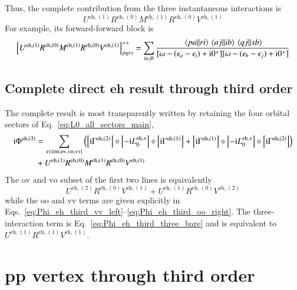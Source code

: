 \documentclass[aip,jcp,reprint,noshowkeys,superscriptaddress]{revtex4-1}
\newcommand{\eps}{\epsilon}
\newcommand{\ii}{\mathrm{i}}
\newcommand{\eh}{\text{eh}}
\begin{document}
Thus, the complete contribution from the three instantaneous interactions is
\begin{equation}
    U^{\eh,(1)}R^{\eh,(0)}M^{\eh,(1)}R^{\eh,(0)}V^{\eh,(1)}
    \label{eq:Phi_eh_third_three_bare}
\end{equation}
For example, its forward-forward block is
\begin{equation}
    \left[
    U^{\eh,(1)}R^{\eh,(0)}M^{\eh,(1)}R^{\eh,(0)}V^{\eh,(1)}
    \right]^{++}_{pqrs}
    =
    \sum_{iajb}
    \frac{
    \mel{pa}{}{ri}\mel{aj}{}{ib}\mel{qj}{}{sb}
    }
    {[\omega-(\eps_a-\eps_i)+\ii0^+]
     [\omega-(\eps_b-\eps_j)+\ii0^+]}
    \label{eq:Phi_eh_third_three_bare_pp}
\end{equation}

\subsection{Complete direct eh result through third order}

The complete result is most transparently written by retaining the four
orbital sectors of Eq.~\eqref{eq:L0_all_sectors_main},
\begin{equation}
    \begin{split}
    \ii\Phi^{\eh,(3)}
    &=
    \sum_{x\in\{\text{oo},\text{ov},\text{vo},\text{vv}\}}
    \qty(
    \left[\ii\Gamma^{\eh,(2)}\right]
    \circ\left[-\ii L_0^{\eh,x}\right]
    \circ\left[\ii\Gamma^{\eh,(1)}\right]
    +
    \left[\ii\Gamma^{\eh,(1)}\right]
    \circ\left[-\ii L_0^{\eh,x}\right]
    \circ\left[\ii\Gamma^{\eh,(2)}\right]
    )
    \\
    &+
    U^{\eh,(1)}R^{\eh,(0)}M^{\eh,(1)}R^{\eh,(0)}V^{\eh,(1)}
    \end{split}
    \label{eq:Phi_eh_third_final}
\end{equation}
The $\text{ov}$ and $\text{vo}$ subset of the first two lines is equivalently
\begin{equation}
    U^{\eh,(2)}R^{\eh,(0)}V^{\eh,(1)}
    +
    U^{\eh,(1)}R^{\eh,(0)}V^{\eh,(2)}
    \label{eq:Phi_eh_third_ovvo_resolvent}
\end{equation}
while the $\text{oo}$ and $\text{vv}$ terms are given explicitly in
Eqs.~\eqref{eq:Phi_eh_third_vv_left}--\eqref{eq:Phi_eh_third_oo_right}.
The three-interaction term is Eq.~\eqref{eq:Phi_eh_third_three_bare} and is
equivalent to $U^{\eh,(1)}R^{\eh,(1)}V^{\eh,(1)}$.


\section{pp vertex through third order}
\label{sec:pp_third}
\end{document}
